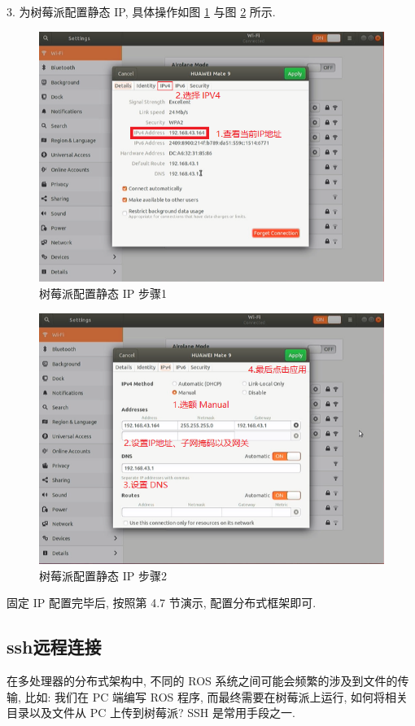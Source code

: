 \documentclass[openany, fontset=windowsold]{ctexbook}
\theoremstyle{kaiti}
\theoremstyle{normal}
\begin{document}
3. 为树莓派配置静态 IP, 具体操作如图 \ref{fig:Raspberry_Pi_static_ip_01} 与图 \ref{fig:Raspberry_Pi_static_ip_02} 所示.

\begin{figure}[!ht]
  \centering
  \includegraphics[width=.7\textwidth]{Raspberry_Pi_static_ip_01.png}
  \caption{树莓派配置静态 IP 步骤1}
  \label{fig:Raspberry_Pi_static_ip_01}
\end{figure}

\begin{figure}[!ht]
  \centering
  \includegraphics[width=.7\textwidth]{Raspberry_Pi_static_ip_02.png}
  \caption{树莓派配置静态 IP 步骤2}
  \label{fig:Raspberry_Pi_static_ip_02}
\end{figure}

固定 IP 配置完毕后, 按照第 4.7 节演示, 配置分布式框架即可.

\subsection{ssh远程连接}

在多处理器的分布式架构中, 不同的 ROS 系统之间可能会频繁的涉及到文件的传输, 比如: 我们在 PC 端编写 ROS 程序, 而最终需要在树莓派上运行, 如何将相关目录以及文件从 PC 上传到树莓派? SSH 是常用手段之一.
\end{document}
